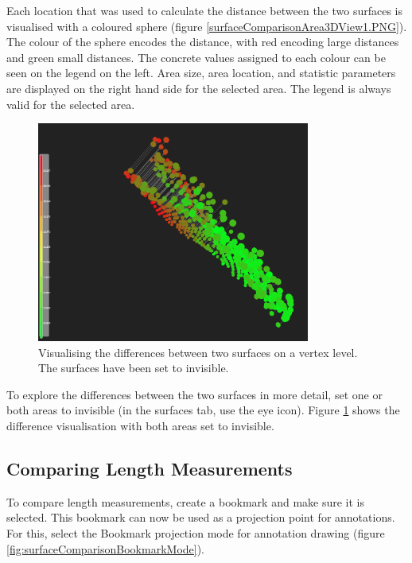 Each location that was used to calculate the distance between the two surfaces is visualised with a coloured sphere (figure \ref{surfaceComparisonArea3DView1.PNG}). The colour of the sphere encodes the distance, with red encoding large distances and green small distances. The concrete values assigned to each colour can be seen on the legend on the left. Area size, area location, and statistic parameters are displayed on the right hand side for the selected area. The legend is always valid for the selected area.

\begin{figure}[h]
	\centering
	\includegraphics[width=0.8\textwidth]{pics/surfaceComparisonArea3DView2.PNG}
	\caption[Visualising the differences between two surfaces.]{Visualising the differences between two surfaces on a vertex level. The surfaces have been set to invisible.}
	\label{surfaceComparisonArea3DView2.PNG}
\end{figure}

To explore the differences between the two surfaces in more detail, set one or both areas to invisible (in the surfaces tab, use the eye icon). Figure \ref{surfaceComparisonArea3DView2.PNG} shows the difference visualisation with both areas set to invisible.

\clearpage
\subsection{Comparing Length Measurements}

To compare length measurements, create a bookmark and make sure it is selected. This bookmark can now be used as a projection point for annotations. For this, select the Bookmark projection mode for annotation drawing (figure \ref{fig:surfaceComparisonBookmarkMode}).


